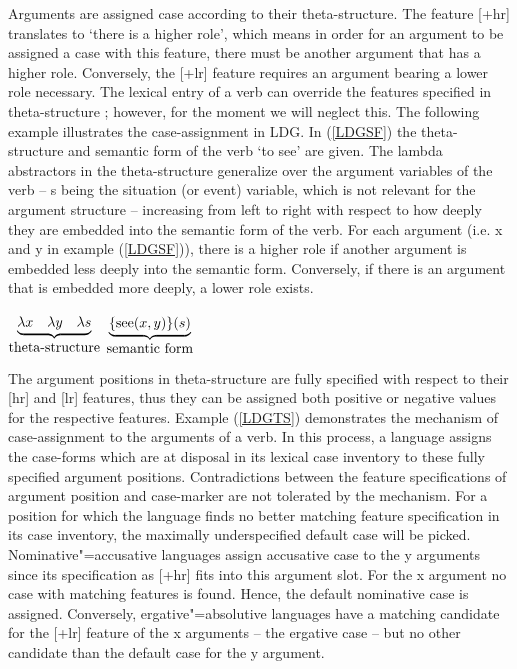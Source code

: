 Arguments are assigned case according to their theta-structure.
The feature [+hr] translates to `there is a higher role', which means in order for an argument to be assigned a case with this feature, there must be another argument that has a higher role. 
Conversely, the [+lr] feature requires an argument bearing a lower role necessary.
The lexical entry of a verb can override the features specified in theta-structure \citep{WunderlichLakaemper:2001}; however, for the moment we will neglect this. 
The following example illustrates the case-assignment in LDG.  In (\ref{LDGSF}) the theta-structure and semantic form of the verb `to see' are given.
The lambda abstractors in the theta-structure generalize over the argument variables of the verb -- {s} being the situation (or event) variable, which is not relevant for the argument structure -- increasing from left to right with respect to how deeply they are embedded into the semantic form of the verb.
For each argument (i.e. {x} and {y} in example (\ref{LDGSF})), there is a higher role if another argument is embedded less deeply into the semantic form. 
Conversely, if there is an argument that is embedded more deeply, a lower role exists.
 
\begin{exe}
\ex\label{LDGSF}
$ \underbrace{ \lambda x \quad \lambda y \quad \lambda s}_{\text{\normalsize\rm theta-structure}}$
\qquad $ \underbrace{\{ \text{see} (x,y)\} (s)}_{\text{\normalsize\rm semantic form}} $ 
\end{exe}

The argument positions in theta-structure are fully specified with respect to their [hr] and [lr] features, thus they can be assigned both positive or negative values for the respective features. 
Example (\ref{LDGTS}) demonstrates the mechanism of case-assignment to the arguments of a verb. 
In this process, a language assigns the case-forms  which are at disposal in its lexical case inventory to these fully specified argument positions. 
Contradictions between the feature specifications of argument position and case-marker are not tolerated by the mechanism. 
For a position for which the language finds no better matching feature specification in its case inventory, the maximally underspecified default case will be picked. 
Nominative"=accusative languages assign accusative case to the {y} arguments since its specification as [+hr] fits into this argument slot. 
For the {x} argument no case with matching features is found. 
Hence, the default nominative case is assigned. 
Conversely, ergative"=absolutive languages have a matching candidate for the [+lr] feature of the {x} arguments -- the ergative case -- but no other candidate than the default case for the {y} argument.  

